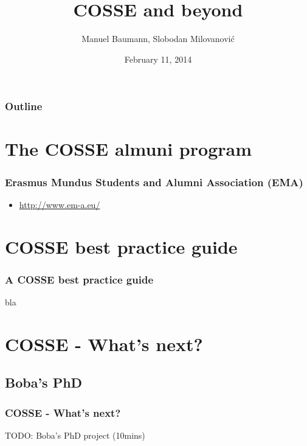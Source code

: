 \documentclass{beamer}
\title{\huge{COSSE and beyond}}
\author{Manuel Baumann, Slobodan Milovanovi\'{c}}
\date{\footnotesize{February 11, 2014}}
\begin{document}
\frame{\titlepage}
\begin{frame}
\frametitle{Outline}
\tableofcontents
\end{frame}


\section{The COSSE almuni program}
\begin{frame}
\frametitle{Erasmus Mundus Students and Alumni Association (EMA)}
\begin{itemize}
 \item \href{http://www.em-a.eu/}{http://www.em-a.eu/} 
\end{itemize}

\end{frame}

\section{COSSE best practice guide}
\begin{frame}
\frametitle{A COSSE best practice guide}
 bla
\end{frame}

\section{COSSE - What's next?}
\subsection{Boba's PhD}
\begin{frame}
\frametitle{COSSE - What's next?}
 TODO: Boba's PhD project (10mins)
\end{frame}
\end{document}
